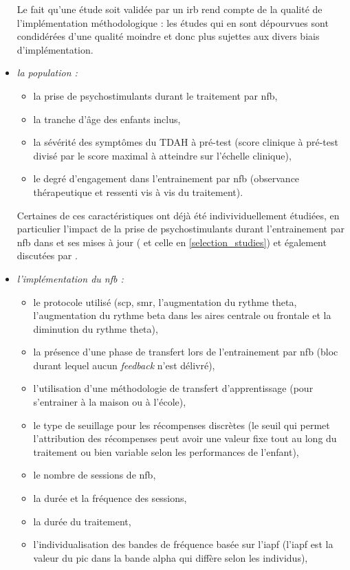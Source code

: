 \begin{itemize}
Le fait qu'une étude soit validée par un \gls{irb} rend compte de la qualité de l'implémentation méthodologique : les études qui en sont dépourvues sont
condidérées d'une qualité moindre et donc plus sujettes aux divers biais d'implémentation.  
\item \emph{la population :} 
    \begin{itemize}
    \item la prise de psychostimulants durant le traitement par \gls{nfb}, 
		\item la tranche d'âge des enfants inclus, 
		\item la sévérité des symptômes du TDAH à pré-test (score clinique à pré-test divisé par le score maximal à atteindre sur l'échelle clinique), 
		\item le degré d'engagement dans l'entrainement par \gls{nfb} (observance thérapeutique et ressenti vis à vis du traitement).
    \end{itemize}
Certaines de ces caractéristiques ont déjà été indivividuellement étudiées, en particulier l'impact de la prise de psychostimulants durant l'entrainement par \gls{nfb} dans
\citet{Cortese2016} et ses mises à jour (\citep{Bussalb2019clinical} et celle en \ref{selection_studies}) et également discutées par \citet{VanDoren2017}.
\item \emph{l'implémentation du \gls{nfb} :} 
    \begin{itemize}
    \item le protocole utilisé (\gls{scp}, \gls{smr}, l'augmentation du rythme theta, l'augmentation du rythme beta dans les aires centrale ou frontale 
    et la diminution du rythme theta), 
		\item la présence d'une phase de transfert lors de l'entrainement par \gls{nfb} (bloc durant lequel aucun \textit{feedback} n'est délivré), 
		\item l'utilisation d'une méthodologie de transfert d'apprentissage (pour s'entrainer à la maison ou à l'école), 
    \item le type de seuillage pour les récompenses discrètes (le seuil qui permet l'attribution des récompenses peut avoir une valeur fixe tout au long du traitement ou bien variable
		selon les performances de l'enfant), 
		\item le nombre de sessions de \gls{nfb}, 
		\item la durée et la fréquence des sessions, 
		\item la durée du traitement, 
		\item l'individualisation des bandes de fréquence basée sur l'\gls{iapf} (l'\gls{iapf} est la valeur du pic dans la bande alpha qui diffère selon les individus), 

\end{itemize}
\end{itemize}
